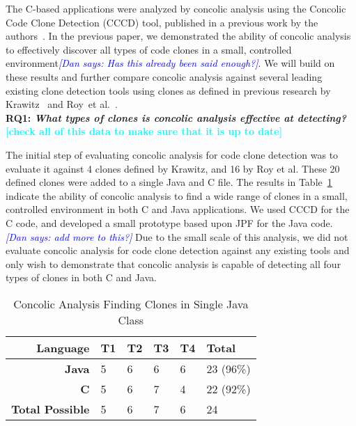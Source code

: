 \documentclass[smallextended]{svjour3}       %
\newcommand{\todo}[1]{\textcolor{cyan}{\textbf{[#1]}}}
\newcommand{\dan}[1]{\textcolor{blue}{{\it [Dan says: #1]}}}
\begin{document}
The C-based applications were analyzed by concolic analysis using the Concolic Code Clone Detection (CCCD) tool, published in a previous work by the authors~\cite{wcre2013}. In the previous paper, we demonstrated the ability of concolic analysis to effectively discover all types of code clones in a small, controlled environment\dan{Has this already been said enough?}. We will build on these results and further compare concolic analysis against several leading existing clone detection tools using clones as defined in previous research by Krawitz~\cite{Kraw2012} and Roy~et al.~\cite{Roy:2009:CEC:1530898.1531101}. \\


\textbf{RQ1: \emph{What types of clones is concolic analysis effective at detecting?}}
\todo{check all of this data to make sure that it is up to date}

The initial step of evaluating concolic analysis for code clone detection was to evaluate it against 4 clones defined by Krawitz, and 16 by Roy et al. These 20 defined clones were added to a single Java and C file. The results in Table~\ref{table:singleclasscomparisionexample} indicate the ability of concolic analysis to find a wide range of clones in a small, controlled environment in both C and Java applications. We used CCCD for the C code, and developed a small prototype based upon JPF for the Java code. \dan{add more to this?} Due to the small scale of this analysis, we did not evaluate concolic analysis for code clone detection against any existing tools and only wish to demonstrate that concolic analysis is capable of detecting all four types of clones in both C and Java.

\begin{table}[thb!]
\begin{center}
\caption{Concolic Analysis Finding Clones in Single Java Class}
\label{table:singleclasscomparisionexample}
\begin{tabular}{r||l|l|l|l|l}
\bfseries Language & \bfseries T1 & \bfseries T2 & \bfseries T3 & \bfseries  T4 & \bfseries  Total \\ \hline\hline
 \bfseries  Java  & 5 & 6 & 6 & 6  & 23 (96\%)\\
  \hline
\bfseries  C  & 5 & 6 & 7 & 4  & 22 (92\%)\\

  \hline
\bfseries Total Possible & 5 & 6 & 7 & 6 & 24 \\ %

\end{tabular}

\end{center}
\end{table}
\end{document}
